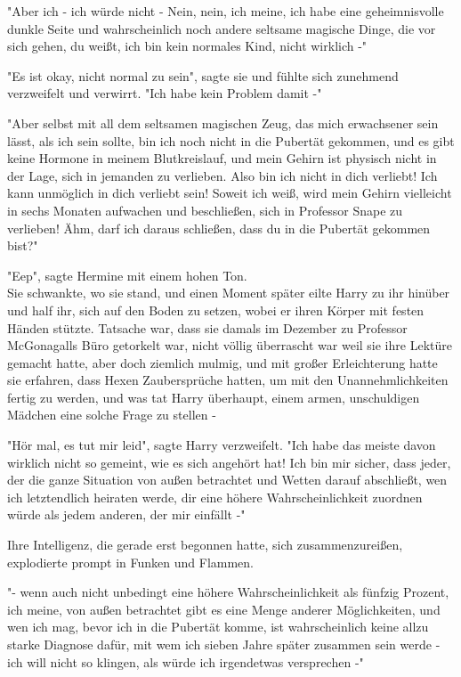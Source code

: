 {"Aber ich - ich würde nicht - Nein, nein, ich meine, ich habe eine geheimnisvolle dunkle Seite und wahrscheinlich noch andere seltsame magische Dinge, die vor sich gehen, du weißt, ich bin kein normales Kind, nicht wirklich -"

"Es ist okay, nicht normal zu sein", sagte sie und fühlte sich zunehmend verzweifelt und verwirrt. "Ich habe kein Problem damit -"

"Aber selbst mit all dem seltsamen magischen Zeug, das mich erwachsener sein lässt, als ich sein sollte, bin ich noch nicht in die Pubertät gekommen, und es gibt keine Hormone in meinem Blutkreislauf, und mein Gehirn ist physisch nicht in der Lage, sich in jemanden zu verlieben. Also bin ich nicht in dich verliebt! Ich kann unmöglich in dich verliebt sein! Soweit ich weiß, wird mein Gehirn vielleicht in sechs Monaten aufwachen und beschließen, sich in Professor Snape zu verlieben! Ähm, darf ich daraus schließen, dass du in die Pubertät gekommen bist?"

"Eep", sagte Hermine mit einem hohen Ton.\\ Sie schwankte, wo sie stand, und einen Moment später eilte Harry zu ihr hinüber und half ihr, sich auf den Boden zu setzen, wobei er ihren Körper mit festen Händen stützte. Tatsache war, dass sie damals im Dezember zu Professor McGonagalls Büro getorkelt war, nicht völlig überrascht war weil sie ihre Lektüre gemacht hatte, aber doch ziemlich mulmig, und mit großer Erleichterung hatte sie erfahren, dass Hexen Zaubersprüche hatten, um mit den Unannehmlichkeiten fertig zu werden, und was tat Harry überhaupt, einem armen, unschuldigen Mädchen eine solche Frage zu stellen -

"Hör mal, es tut mir leid", sagte Harry verzweifelt. "Ich habe das meiste davon wirklich nicht so gemeint, wie es sich angehört hat! Ich bin mir sicher, dass jeder, der die ganze Situation von außen betrachtet und Wetten darauf abschließt, wen ich letztendlich heiraten werde, dir eine höhere Wahrscheinlichkeit zuordnen würde als jedem anderen, der mir einfällt -"

Ihre Intelligenz, die gerade erst begonnen hatte, sich zusammenzureißen, explodierte prompt in Funken und Flammen.

"- wenn auch nicht unbedingt eine höhere Wahrscheinlichkeit als fünfzig Prozent, ich meine, von außen betrachtet gibt es eine Menge anderer Möglichkeiten, und wen ich mag, bevor ich in die Pubertät komme, ist wahrscheinlich keine allzu starke Diagnose dafür, mit wem ich sieben Jahre später zusammen sein werde - ich will nicht so klingen, als würde ich irgendetwas versprechen -"

}
